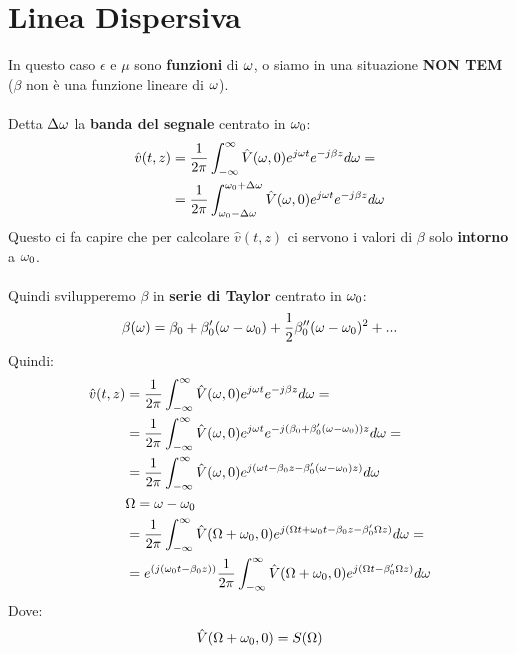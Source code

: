 \section{Linea Dispersiva}
In questo caso $\epsilon$ e $\mu$ sono \textbf{funzioni} di $\omega$, o siamo in una situazione \textbf{NON TEM} ($\beta$ non è una funzione lineare di $\omega$).\\ \\

Detta $\Delta \omega$ la \textbf{banda del segnale} centrato in $\omega_0$:
\begin{equation*}
    \begin{aligned}
    \hat{v}(t,z) &= \frac{1}{2\pi} \int_{- \infty}^{\infty}\hat{V}(\omega, 0)e^{j\omega t}e^{-j\beta z} d\omega = \\
    &= \frac{1}{2\pi} \int_{\omega_0 - \Delta \omega}^{\omega_0 + \Delta \omega}\hat{V}(\omega, 0)e^{j\omega t}e^{-j\beta z} d\omega 
    \end{aligned}
\end{equation*}
Questo ci fa capire che per calcolare $\hat{v}(t,z)$ ci servono i valori di $\beta$ solo \textbf{intorno} a $\omega_0$.\\ \\
Quindi svilupperemo $\beta$ in \textbf{serie di Taylor} centrato in $\omega_0$:
\begin{equation*}
    \beta(\omega) = \beta_0 + \beta'_0(\omega -\omega_0) + \frac{1}{2} \beta''_0 (\omega - \omega_0)^2 + ...
\end{equation*}
Quindi:
\begin{equation*}
    \begin{aligned}
    \hat{v}(t,z) &=  \frac{1}{2\pi} \int_{- \infty}^{\infty}\hat{V}(\omega, 0)e^{j\omega t}e^{-j\beta z} d\omega = \\
    &= \frac{1}{2\pi} \int_{- \infty}^{\infty}\hat{V}(\omega, 0)e^{j\omega t}e^{-j(\beta_0 + \beta'_0(\omega -\omega_0)) z} d\omega = \\
    &= \frac{1}{2\pi} \int_{- \infty}^{\infty}\hat{V}(\omega, 0)e^{j(\omega t - \beta_0 z - \beta'_0(\omega -\omega_0)z )} d\omega\\
    &\Omega = \omega - \omega_0\\
    &= \frac{1}{2\pi} \int_{- \infty}^{\infty}\hat{V}(\Omega + \omega_0 , 0) e^{j(\Omega t + \omega_0 t - \beta_0 z - \beta'_0\Omega z )} d\omega = \\
    &= e^{(j(\omega_0 t - \beta_0 z))} \frac{1}{2\pi} \int_{- \infty}^{\infty}\hat{V}(\Omega + \omega_0 , 0) e^{j(\Omega t - \beta'_0 \Omega z)} d\omega
    \end{aligned}
\end{equation*}
Dove:
\begin{equation*}
    \hat{V}(\Omega + \omega_0, 0) = S(\Omega)
\end{equation*}
